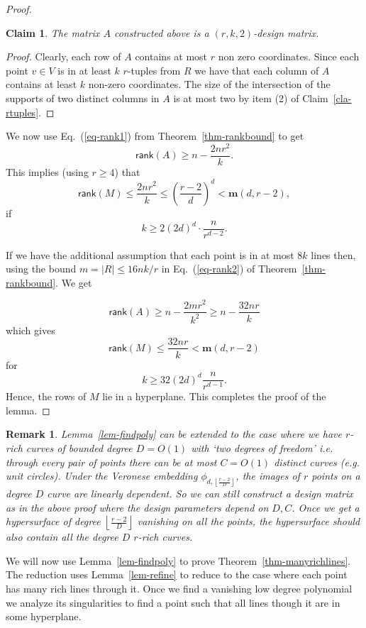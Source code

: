 \documentclass[11pt]{article}
\newtheorem{claim}[thm]{Claim}
\newtheorem{rem}[thm]{Remark}
\def\m{{\mathbf{m}}}
\def\rank{\textsf{rank}}
\newcommand{\floor}[1]{\left\lfloor #1\right\rfloor}
\begin{document}
\begin{proof}
\begin{claim}\label{cla-Adesign}
The matrix $A$ constructed above is a $(r,k,2)$-design matrix. 
\end{claim}
\begin{proof}
Clearly, each row of $A$ contains at most $r$ non zero coordinates. Since each point $v \in V$ is in at least $k$ $r$-tuples from $R$ we have that each column of $A$ contains at least $k$ non-zero coordinates. The size of the intersection of the supports of two distinct columns in $A$ is at most two by item (2) of Claim~\ref{cla-rtuples}.
\end{proof}

We now use Eq.~(\ref{eq-rank1}) from  Theorem~\ref{thm-rankbound} to get $$\rank(A)\ge n-\frac{2nr^2}{k}.$$ This implies (using $r \geq 4$) that
$$ \rank(M) \leq \frac{2nr^2}{k}  \leq \left(\frac{r-2}{d}\right)^d < \m(d,r-2),$$ if $$k \geq  2(2d)^d \cdot \frac{n}{r^{d-2}}.$$

If we have the additional assumption that each point is in at most $8k$ lines then, using the bound $m= |R| \leq 16nk/r $ in Eq.~(\ref{eq-rank2}) of Theorem~\ref{thm-rankbound}. We get

$$\rank(A) \geq n-\frac{2mr^2}{k^2} \geq n - \frac{32nr}{k}$$ which gives
$$ \rank(M) \leq \frac{32nr}{k}  < \m(d,r-2)$$  for 
$$ k  \geq 32(2d)^d \frac{n}{r^{d-1}}.$$ Hence, the rows of $M$ lie in a hyperplane. This  completes the proof of the lemma.
\end{proof}

\begin{rem}
\label{rem-bounded-degree-curves}
Lemma~\ref{lem-findpoly} can be extended to the case where we have $r$-rich curves of bounded degree $D=O(1)$ with `two degrees of freedom' i.e. through every pair of points there can be at most $C=O(1)$ distinct curves (e.g. unit circles). Under the Veronese embedding $\phi_{d,\floor{\frac{r-2}{D}}}$, the images of $r$ points on a degree $D$ curve are linearly dependent.  So we can still construct a design matrix as in the above proof where the design parameters depend on $D,C$. Once we get a hypersurface of degree $\floor{\frac{r-2}{D}}$ vanishing on all the points, the hypersurface should also contain all the degree $D$ $r$-rich curves.
\end{rem}


We will now use Lemma~\ref{lem-findpoly} to prove Theorem~\ref{thm-manyrichlines}. The reduction uses Lemma~\ref{lem-refine} to reduce to the case where each point has many rich lines through it. Once we find a vanishing low degree polynomial we analyze its singularities to find a point such that all lines though it are in some hyperplane.
\end{document}

